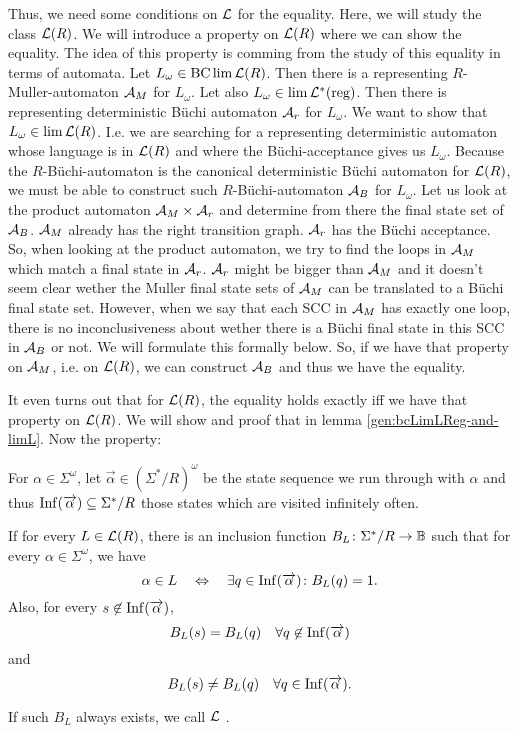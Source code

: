 Thus, we need some conditions on $\mathcal{L}$ for the equality. Here, we will study the class $\mathcal{L}(R)$. We will introduce a property on $\mathcal{L}(R)$ where we can show the equality. The idea of this property is comming from the study of this equality in terms of automata. Let $L_\omega \in \operatorname{BC} \lim \mathcal{L}(R)$. Then there is a representing $R$-Muller-automaton $\mathcal{A}_M$ for $L_\omega$. Let also $L_\omega \in \lim \mathcal{L}^*(\text{reg})$. Then there is representing deterministic Büchi automaton $\mathcal{A}_r$ for $L_\omega$. We want to show that $L_\omega \in \lim \mathcal{L}(R)$. I.e. we are searching for a representing deterministic automaton whose language is in $\mathcal{L}(R)$ and where the Büchi-acceptance gives us $L_\omega$. Because the $R$-Büchi-automaton is the canonical deterministic Büchi automaton for $\mathcal{L}(R)$, we must be able to construct such $R$-Büchi-automaton $\mathcal{A}_B$ for $L_\omega$. Let us look at the product automaton $\mathcal{A}_M \times \mathcal{A}_r$ and determine from there the final state set of $\mathcal{A}_B$. $\mathcal{A}_M$ already has the right transition graph. $\mathcal{A}_r$ has the Büchi acceptance. So, when looking at the product automaton, we try to find the loops in $\mathcal{A}_M$ which match a final state in $\mathcal{A}_r$. $\mathcal{A}_r$ might be bigger than $\mathcal{A}_M$ and it doesn't seem clear wether the Muller final state sets of $\mathcal{A}_M$ can be translated to a Büchi final state set. However, when we say that each SCC in $\mathcal{A}_M$ has exactly one loop, there is no inconclusiveness about wether there is a Büchi final state in this SCC in $\mathcal{A}_B$ or not. We will formulate this formally below. So, if we have that property on $\mathcal{A}_M$, i.e. on $\mathcal{L}(R)$, we can construct $\mathcal{A}_B$ and thus we have the equality.

It even turns out that for $\mathcal{L}(R)$, the equality holds exactly iff we have that property on $\mathcal{L}(R)$. We will show and proof that in lemma \ref{gen:bcLimLReg-and-limL}. Now the property:

\begin{mydef}
For $\alpha \in \Sigma^\omega$, let $\overrightarrow \alpha \in (\Sigma^* / R)^\omega$ be the state sequence we run through with $\alpha$ and thus $\operatorname{Inf}(\overrightarrow \alpha) \subseteq \Sigma^*/R$ those states which are visited infinitely often.

If for every $L \in \mathcal{L}(R)$, there is an inclusion function $B_L \colon \Sigma^*/R \rightarrow \mathbb{B}$ such that for every $\alpha \in \Sigma^\omega$, we have
\[ \alpha \in L \ \ \ \Leftrightarrow \ \ \ \exists q \in \operatorname{Inf}(\overrightarrow \alpha) \colon B_L(q) = 1 . \]
Also, for every $s \not\in \operatorname{Inf}(\overrightarrow \alpha)$,
\[ B_L(s) = B_L(q) \ \ \ \forall q \not\in \operatorname{Inf}(\overrightarrow \alpha) \]
and
\[ B_L(s) \neq B_L(q) \ \ \ \forall q \in \operatorname{Inf}(\overrightarrow \alpha) . \]

If such $B_L$ always exists, we call $\mathcal{L}$ .
\end{mydef}

